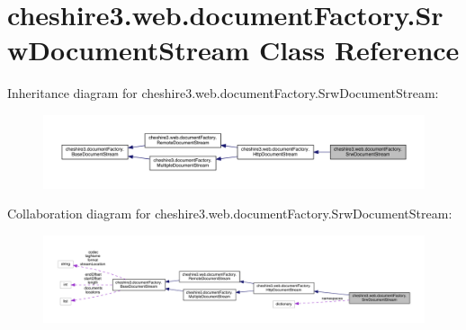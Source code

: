 \hypertarget{classcheshire3_1_1web_1_1document_factory_1_1_srw_document_stream}{\section{cheshire3.\-web.\-document\-Factory.\-Srw\-Document\-Stream Class Reference}
\label{classcheshire3_1_1web_1_1document_factory_1_1_srw_document_stream}
}


Inheritance diagram for cheshire3.\-web.\-document\-Factory.\-Srw\-Document\-Stream\-:
\nopagebreak
\begin{figure}[H]
\begin{center}
\leavevmode
\includegraphics[width=350pt]{classcheshire3_1_1web_1_1document_factory_1_1_srw_document_stream__inherit__graph}
\end{center}
\end{figure}


Collaboration diagram for cheshire3.\-web.\-document\-Factory.\-Srw\-Document\-Stream\-:
\nopagebreak
\begin{figure}[H]
\begin{center}
\leavevmode
\includegraphics[width=350pt]{classcheshire3_1_1web_1_1document_factory_1_1_srw_document_stream__coll__graph}
\end{center}
\end{figure}
